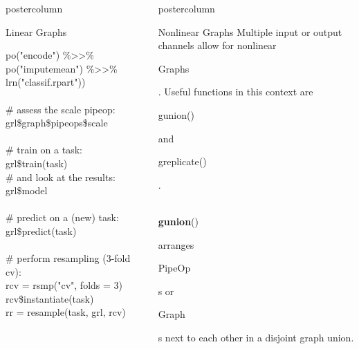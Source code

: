 \documentclass{beamer}
\newlength{\columnheight} %
\newcommand{\codeinline}[1]{\begin{codeboxinline}#1\end{codeboxinline}}
\begin{document}
\begin{frame}[fragile]{}
\begin{columns}
\begin{column}{.245\textwidth}
\begin{beamercolorbox}[center]{postercolumn}
\begin{minipage}{.98\textwidth}
{\begin{myblock}{Linear Graphs}
\begin{codeboxexample}
{                  \hspace*{1ex} po("encode") \%>{}>\% po("imputemean") \%>{}>\%\\
                  \hspace*{1ex} lrn("classif.rpart"))\\
                  \ \\
                  \# assess the scale pipeop:
                  grl\$graph\$pipeops\$scale\\
                  \ \\
                  \# train on a task:\\
                  grl\$train(task)\\
                  \# and look at the results:\\
                  grl\$model\\
                  \ \\
                  \# predict on a (new) task:\\
                  grl\$predict(task)\\
                  \ \\
                  \# perform resampling (3-fold cv):\\
                  rcv = rsmp("cv", folds = 3)\\
                  rcv\$instantiate(task)\\
                  rr = resample(task, grl, rcv)}
              \end{codeboxexample}
            \end{myblock}
				    \vfill}
				\end{minipage}
			\end{beamercolorbox}
		\end{column}
    \begin{column}{.245\textwidth}
			\begin{beamercolorbox}[center]{postercolumn}
				\begin{minipage}{.98\textwidth}
					\parbox[t][\columnheight]{\textwidth}{
             \begin{myblock}{Nonlinear Graphs}
              Multiple input or output channels allow for nonlinear \codeinline{Graphs}. Useful functions in this context are \codeinline{gunion()} and \codeinline{greplicate()}.\\
              \ \\
              \codeinline{\textbf{gunion}()} arranges \codeinline{PipeOp}s or \codeinline{Graph}s next to each other in a disjoint graph union.

\end{myblock}}
\end{minipage}
\end{beamercolorbox}
\end{column}
\end{columns}
\end{frame}
\end{document}
